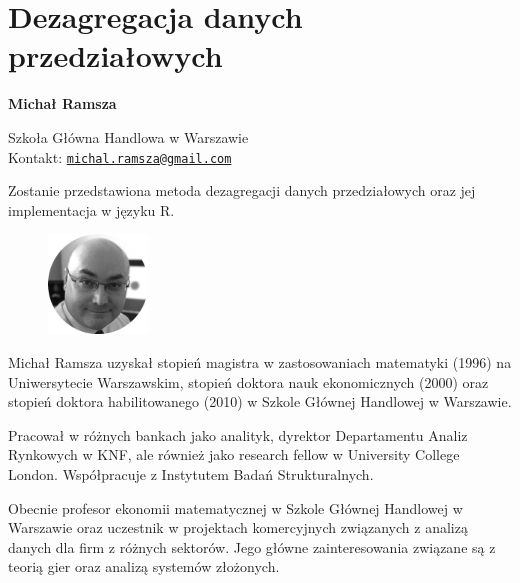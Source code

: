 \documentclass[\main/boa.tex]{subfiles}
\begin{document}
\section{Dezagregacja danych przedziałowych}


\begin{minipage}{0.915\textwidth}
	\centering
  {\bf \LARGE {} Michał Ramsza}
\end{minipage}


\begin{affiliations}
\begin{minipage}{0.915\textwidth}
\centering
\large Szkoła Główna Handlowa w Warszawie \\[1pt]
Kontakt: \href{mailto:michal.ramsza@gmail.com}{\nolinkurl{michal.ramsza@gmail.com}}\\
\end{minipage}
\end{affiliations}


Zostanie przedstawiona metoda dezagregacji danych przedziałowych oraz jej implementacja w języku R. 

\bio
\begin{figure}
    \includegraphics[width=100px]{img/guests/czarno_biale/mramsza-crop.png}
\end{figure} 
Michał Ramsza uzyskał stopień magistra w zastosowaniach matematyki (1996) na Uniwersytecie Warszawskim, stopień doktora nauk ekonomicznych (2000) oraz stopień doktora habilitowanego (2010) w Szkole Głównej Handlowej w Warszawie.

Pracował w różnych bankach jako analityk, dyrektor Departamentu Analiz Rynkowych w KNF, ale również jako research fellow w University College London. Współpracuje z Instytutem Badań Strukturalnych.

Obecnie profesor ekonomii matematycznej w Szkole Głównej Handlowej w Warszawie oraz uczestnik w projektach komercyjnych związanych z analizą danych dla firm z różnych sektorów. Jego główne zainteresowania związane są z teorią gier oraz analizą systemów złożonych.
\end{document}
